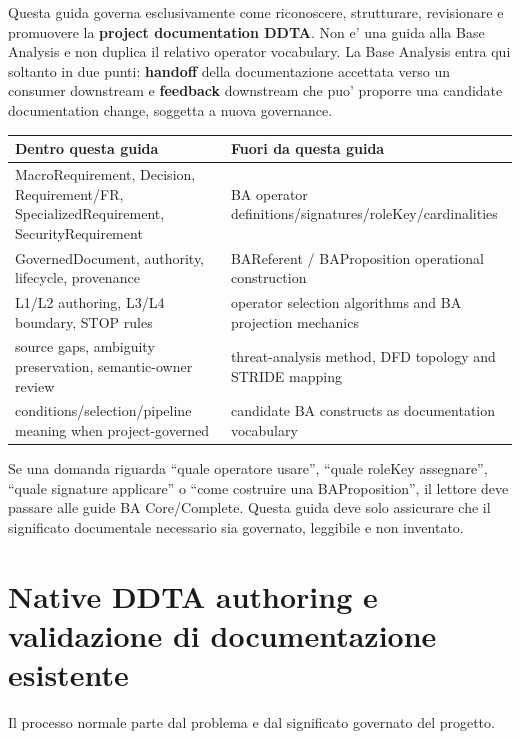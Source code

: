\documentclass[11pt,a4paper]{article}
\begin{document}
\begin{ddtacore}[title={Separation contract}]
Questa guida governa esclusivamente come riconoscere, strutturare, revisionare e promuovere la \textbf{project documentation DDTA}. Non e' una guida alla Base Analysis e non duplica il relativo operator vocabulary. La Base Analysis entra qui soltanto in due punti: \textbf{handoff} della documentazione accettata verso un consumer downstream e \textbf{feedback} downstream che puo' proporre una candidate documentation change, soggetta a nuova governance.
\end{ddtacore}

\begin{tabularx}{\textwidth}{L{47mm}Y}
\toprule
\textbf{Dentro questa guida} & \textbf{Fuori da questa guida} \\
\midrule
MacroRequirement, Decision, Requirement/FR, SpecializedRequirement, SecurityRequirement & BA operator definitions/signatures/roleKey/cardinalities \\
GovernedDocument, authority, lifecycle, provenance & BAReferent / BAProposition operational construction \\
L1/L2 authoring, L3/L4 boundary, STOP rules & operator selection algorithms and BA projection mechanics \\
source gaps, ambiguity preservation, semantic-owner review & threat-analysis method, DFD topology and STRIDE mapping \\
conditions/selection/pipeline meaning when project-governed & candidate BA constructs as documentation vocabulary \\
\bottomrule
\end{tabularx}

\begin{ddtaanti}[title={No duplicated BA method}]
Se una domanda riguarda ``quale operatore usare'', ``quale roleKey assegnare'', ``quale signature applicare'' o ``come costruire una BAProposition'', il lettore deve passare alle guide BA Core/Complete. Questa guida deve solo assicurare che il significato documentale necessario sia governato, leggibile e non inventato.
\end{ddtaanti}

\section{Native DDTA authoring e validazione di documentazione esistente}
\closedtag

Il processo normale parte dal problema e dal significato governato del progetto.
\end{document}
